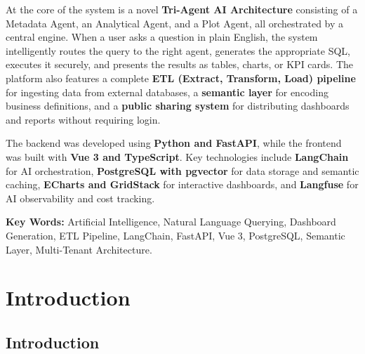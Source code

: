 \documentclass[12pt,a4paper]{report}
\begin{document}
At the core of the system is a novel \textbf{Tri-Agent AI Architecture} consisting of a Metadata Agent, an Analytical Agent, and a Plot Agent, all orchestrated by a central engine. When a user asks a question in plain English, the system intelligently routes the query to the right agent, generates the appropriate SQL, executes it securely, and presents the results as tables, charts, or KPI cards. The platform also features a complete \textbf{ETL (Extract, Transform, Load) pipeline} for ingesting data from external databases, a \textbf{semantic layer} for encoding business definitions, and a \textbf{public sharing system} for distributing dashboards and reports without requiring login.

The backend was developed using \textbf{Python and FastAPI}, while the frontend was built with \textbf{Vue 3 and TypeScript}. Key technologies include \textbf{LangChain} for AI orchestration, \textbf{PostgreSQL with pgvector} for data storage and semantic caching, \textbf{ECharts and GridStack} for interactive dashboards, and \textbf{Langfuse} for AI observability and cost tracking.

\vspace{0.5cm}
\noindent\textbf{Key Words:} Artificial Intelligence, Natural Language Querying, Dashboard Generation, ETL Pipeline, LangChain, FastAPI, Vue 3, PostgreSQL, Semantic Layer, Multi-Tenant Architecture.

\newpage
\tableofcontents

\newpage
\listoffigures
{}

\newpage
\listoftables
{}

\setcounter{page}{1}

\chapter{Introduction}

\section{Introduction}
\end{document}
